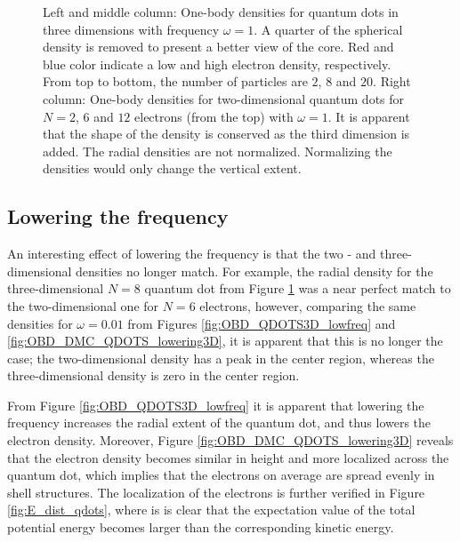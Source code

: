 \begin{figure}
\begin{center}
\begin{tabular}{cc|c}
  \end{tabular}
  \caption{Left and middle column: One-body densities for quantum dots in three dimensions with frequency $\omega=1$. A quarter of the spherical density is removed to present a better view of the core.  Red and blue color indicate a low and high electron density, respectively. From top to bottom, the number of particles are $2$, $8$ and $20$. Right column: One-body densities for two-dimensional quantum dots for $N=2$, $6$ and $12$ electrons (from the top) with $\omega=1$. It is apparent that the  shape of the density is conserved as the third dimension is added. The radial densities are not normalized. Normalizing the densities would only change the vertical extent.}
  \label{fig:OBD_QDOTS3D_highfreq}
 \end{center}
\end{figure}

\captionsetup[subfloat]{labelformat=parens}

\clearpage

\subsection{Lowering the frequency}

An interesting effect of lowering the frequency is that the two - and three-dimensional densities no longer match. For example, the radial density for the three-dimensional $N=8$ quantum dot from Figure \ref{fig:OBD_QDOTS3D_highfreq} was a near perfect match to the two-dimensional one for $N=6$ electrons, however, comparing the same densities for $\omega=0.01$ from Figures \ref{fig:OBD_QDOTS3D_lowfreq} and \ref{fig:OBD_DMC_QDOTS_lowering3D}, it is apparent that this is no longer the case; the two-dimensional density has a peak in the center region, whereas the three-dimensional density is zero in the center region.

From Figure \ref{fig:OBD_QDOTS3D_lowfreq} it is apparent that lowering the frequency increases the radial extent of the quantum dot, and thus lowers the electron density. Moreover, Figure \ref{fig:OBD_DMC_QDOTS_lowering3D} reveals that the electron density becomes similar in height and more localized across the quantum dot, which implies that the electrons on average are spread evenly in shell structures. The localization of the electrons is further verified in Figure \ref{fig:E_dist_qdots}, where is is clear that the expectation value of the total potential energy becomes larger than the corresponding kinetic energy.

